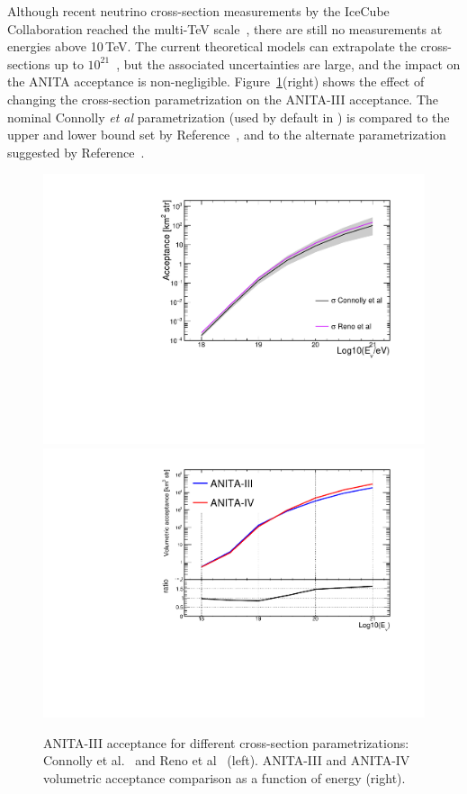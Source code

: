 Although recent neutrino cross-section measurements by the IceCube
Collaboration reached the multi-TeV
scale~\cite{aartsen2017measurement,bustamante2017measurement}, there
are still no measurements at energies above 10\,TeV.
The current theoretical models can extrapolate the cross-sections up to $10^{21}$\ev~\cite{PhysRevD.83.113009,reno2005high},
but the associated uncertainties are
large, and the impact on the ANITA acceptance is
non-negligible.
Figure~\ref{fig:acceptanceVSxsec}(right) shows the effect of changing the
cross-section parametrization on the ANITA-III acceptance.
The nominal Connolly {\it et al} parametrization (used by default in
\icemc) is compared to the upper and lower bound set by
Reference~\cite{PhysRevD.83.113009}, and to the alternate
parametrization suggested by Reference~\cite{reno2005high}.


\begin{figure}[!h]\centering
  \includegraphics[width=.45\linewidth]{./Figs/AcceptanceVScrossSectionParam_ANITA3.pdf}
  \includegraphics[width=.45\linewidth]{./Figs/CompareEffVol_A3vsA4.pdf}
  \caption{ANITA-III acceptance for different cross-section parametrizations: Connolly et al.~\cite{PhysRevD.83.113009} and Reno et al~\cite{reno2005high} (left). ANITA-III and ANITA-IV volumetric acceptance comparison as a function of energy (right).}
  \label{fig:acceptanceVSxsec}
\end{figure}


